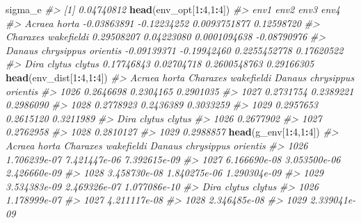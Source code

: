 \documentclass[
]{article}
\newenvironment{Shaded}{\begin{snugshade}}{\end{snugshade}}
\newcommand{\CommentTok}[1]{\textcolor[rgb]{0.56,0.35,0.01}{\textit{#1}}}
\newcommand{\DecValTok}[1]{\textcolor[rgb]{0.00,0.00,0.81}{#1}}
\newcommand{\FunctionTok}[1]{\textcolor[rgb]{0.13,0.29,0.53}{\textbf{#1}}}
\newcommand{\NormalTok}[1]{#1}
\newcommand{\SpecialCharTok}[1]{\textcolor[rgb]{0.81,0.36,0.00}{\textbf{#1}}}
\begin{document}
\begin{Shaded}
\begin{Highlighting}[]
\NormalTok{sigma\_e}
\CommentTok{\#\textgreater{} [1] 0.04740812}
\FunctionTok{head}\NormalTok{(env\_opt[}\DecValTok{1}\SpecialCharTok{:}\DecValTok{4}\NormalTok{,}\DecValTok{1}\SpecialCharTok{:}\DecValTok{4}\NormalTok{])}
\CommentTok{\#\textgreater{}                                   env1        env2         env3        env4}
\CommentTok{\#\textgreater{} Acraea horta               {-}0.03863891 {-}0.12234252 0.0093751877  0.12598720}
\CommentTok{\#\textgreater{} Charaxes wakefieldi         0.29508207  0.04223080 0.0001094638 {-}0.08790976}
\CommentTok{\#\textgreater{} Danaus chrysippus orientis {-}0.09139371 {-}0.19942460 0.2255452778  0.17620522}
\CommentTok{\#\textgreater{} Dira clytus clytus          0.17746843  0.02704718 0.2600548763  0.29166305}
\FunctionTok{head}\NormalTok{(env\_dist[}\DecValTok{1}\SpecialCharTok{:}\DecValTok{4}\NormalTok{,}\DecValTok{1}\SpecialCharTok{:}\DecValTok{4}\NormalTok{])}
\CommentTok{\#\textgreater{}      Acraea horta Charaxes wakefieldi Danaus chrysippus orientis}
\CommentTok{\#\textgreater{} 1026    0.2646698           0.2304165                  0.2901035}
\CommentTok{\#\textgreater{} 1027    0.2731754           0.2389221                  0.2986090}
\CommentTok{\#\textgreater{} 1028    0.2778923           0.2436389                  0.3033259}
\CommentTok{\#\textgreater{} 1029    0.2957653           0.2615120                  0.3211989}
\CommentTok{\#\textgreater{}      Dira clytus clytus}
\CommentTok{\#\textgreater{} 1026          0.2677902}
\CommentTok{\#\textgreater{} 1027          0.2762958}
\CommentTok{\#\textgreater{} 1028          0.2810127}
\CommentTok{\#\textgreater{} 1029          0.2988857}
\FunctionTok{head}\NormalTok{(g\_env[}\DecValTok{1}\SpecialCharTok{:}\DecValTok{4}\NormalTok{,}\DecValTok{1}\SpecialCharTok{:}\DecValTok{4}\NormalTok{])}
\CommentTok{\#\textgreater{}      Acraea horta Charaxes wakefieldi Danaus chrysippus orientis}
\CommentTok{\#\textgreater{} 1026 1.706239e{-}07        7.421447e{-}06               7.392615e{-}09}
\CommentTok{\#\textgreater{} 1027 6.166690e{-}08        3.053500e{-}06               2.426660e{-}09}
\CommentTok{\#\textgreater{} 1028 3.458730e{-}08        1.840275e{-}06               1.290304e{-}09}
\CommentTok{\#\textgreater{} 1029 3.534383e{-}09        2.469326e{-}07               1.077086e{-}10}
\CommentTok{\#\textgreater{}      Dira clytus clytus}
\CommentTok{\#\textgreater{} 1026       1.178999e{-}07}
\CommentTok{\#\textgreater{} 1027       4.211117e{-}08}
\CommentTok{\#\textgreater{} 1028       2.346485e{-}08}
\CommentTok{\#\textgreater{} 1029       2.339041e{-}09}
\end{Highlighting}
\end{Shaded}
\end{document}
